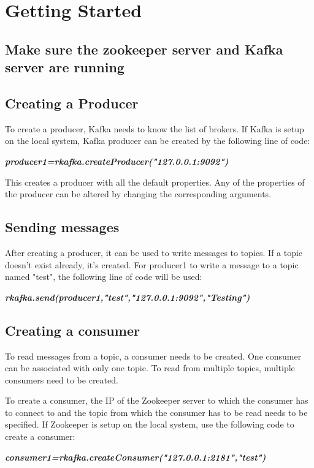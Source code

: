 \documentclass[english,pdftex,a4paper]{article}
\begin{document}
\section{Getting Started}
\par{\subsection{\textbf{Make sure the zookeeper server and Kafka server are running}}}
\par{\subsection{\textbf{Creating a Producer}}}
\par{To create a producer, Kafka needs to know the list of brokers. If Kafka is setup on the local system, Kafka producer can be created by the following line of code:}
\par{\textit{\textbf{producer1=rkafka.createProducer("127.0.0.1:9092")}}}
\par{This creates a producer with all the default properties. Any of the properties of the producer can be altered by changing the corresponding arguments.}
\subsection{\textbf{Sending messages}}
\par{After creating a producer, it can be used to write messages to topics. If a topic doesn't exist already, it's created. For producer1 to write a message to a topic named "test", the following line of code will be used:}
\par{\textit{\textbf{rkafka.send(producer1,"test","127.0.0.1:9092","Testing")}}}
\subsection{\textbf{Creating a consumer}}
\par{To read messages from a topic, a consumer needs to be created. One consumer can be associated with only one topic. To read from multiple topics, multiple consumers need to be created.}
\par{To create a consumer, the IP of the Zookeeper server to which the consumer has to connect to and the topic from which the consumer has to be read needs to be specified. If Zookeeper is setup on the local system, use the following code to create a consumer:}
\par{\textit{\textbf{consumer1=rkafka.createConsumer("127.0.0.1:2181","test")}}}
\end{document}

